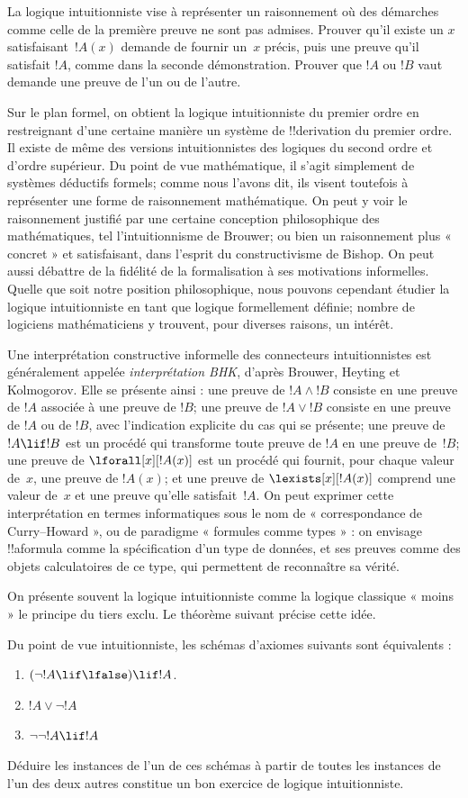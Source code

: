\documentclass[../../../include/open-logic-section]{subfiles}
\begin{document}
La logique intuitionniste vise à représenter un raisonnement où
des démarches comme celle de la première preuve ne sont pas admises.
Prouver qu'il existe un $x$ satisfaisant~$!A(x)$ demande de fournir
un~$x$ précis, puis une preuve qu'il satisfait $!A$, comme dans
la seconde démonstration. Prouver que $!A$ ou $!B$ vaut demande une
preuve de l'un ou de l'autre.

Sur le plan formel, on obtient la logique intuitionniste du premier
ordre en restreignant d'une certaine manière un système de
!!{derivation} du premier ordre. Il existe de même des versions
intuitionnistes des logiques du second ordre et d'ordre supérieur.
Du point de vue mathématique, il s'agit simplement de systèmes
déductifs formels; comme nous l'avons dit, ils visent toutefois à
représenter une forme de raisonnement mathématique. On peut y voir
le raisonnement justifié par une certaine conception philosophique
des mathématiques, tel l'intuitionnisme de Brouwer; ou bien un
raisonnement plus « concret » et satisfaisant, dans l'esprit du
constructivisme de Bishop. On peut aussi débattre de la fidélité de
la formalisation à ses motivations informelles. Quelle que soit
notre position philosophique, nous pouvons cependant étudier la
logique intuitionniste en tant que logique formellement définie;
nombre de logiciens mathématiciens y trouvent, pour diverses raisons,
un intérêt.

Une interprétation constructive informelle des connecteurs
intuitionnistes est généralement appelée \emph{interprétation BHK},
d'après Brouwer, Heyting et Kolmogorov. Elle se présente ainsi :
une preuve de $!A \land !B$ consiste en une preuve de $!A$
associée à une preuve de $!B$; une preuve de $!A \lor !B$ consiste
en une preuve de $!A$ ou de $!B$, avec l'indication explicite du
cas qui se présente; une preuve de $!A \lif !B$ est un procédé
qui transforme toute preuve de $!A$ en une preuve de~$!B$; une
preuve de $\lforall[x][!A(x)]$ est un procédé qui fournit, pour
chaque valeur de~$x$, une preuve de $!A(x)$; et une preuve de
$\lexists[x][!A(x)]$ comprend une valeur de~$x$ et une preuve
qu'elle satisfait~$!A$. On peut exprimer cette interprétation
en termes informatiques sous le nom de « correspondance de
Curry--Howard », ou de paradigme « formules comme types » :
on envisage !!a{formula} comme la spécification d'un type de données,
et ses preuves comme des objets calculatoires de ce type, qui
permettent de reconnaître sa vérité.

On présente souvent la logique intuitionniste comme la logique
classique « moins » le principe du tiers exclu. Le théorème
suivant précise cette idée.
\begin{thm}
Du point de vue intuitionniste, les schémas d'axiomes suivants
sont équivalents :
\begin{enumerate}
\item $(\lnot !A \lif \lfalse) \lif !A$.
\item $!A \lor \lnot !A$
\item $\lnot \lnot !A \lif !A$
\end{enumerate}
\end{thm}
Déduire les instances de l'un de ces schémas à partir de toutes les instances de l'un des
deux autres constitue un bon exercice de logique intuitionniste.
\end{document}
